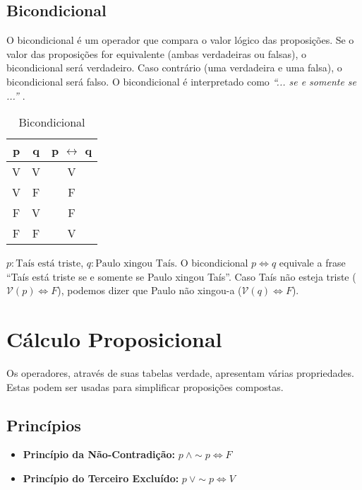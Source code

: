 \subsection*{Bicondicional}
O bicondicional é um operador que compara o valor lógico das proposições. Se o valor das proposições for equivalente (ambas verdadeiras ou falsas), o bicondicional será verdadeiro. Caso contrário (uma verdadeira e uma falsa), o bicondicional será falso. O bicondicional é interpretado como \textit{``... se e somente se ...''} .
\begin{table}[H]
\centering
\caption{Bicondicional}
\label{ifonlyif}
\begin{tabular}{c|c|c}
\textbf{p} & \textbf{q} & \textbf{p $\leftrightarrow$ q} \\ \hline
V          & V          & V             \\
V          & F          & F             \\
F          & V          & F             \\
F          & F          & V            
\end{tabular}
\end{table}
\begin{exemplo}
$p: \text{Taís está triste}$, $q: \text{Paulo xingou Taís}$. O bicondicional $p \Leftrightarrow q$ equivale a frase ``Taís está triste se e somente se Paulo xingou Taís''. Caso Taís não esteja triste ($\mathcal{V}(p) \Leftrightarrow F$), podemos dizer que Paulo não xingou-a ($\mathcal{V}(q) \Leftrightarrow F$).
\end{exemplo}

\section{Cálculo Proposicional}
Os operadores, através de suas tabelas verdade, apresentam várias propriedades. Estas podem ser usadas para simplificar proposições compostas.

\subsection*{Princípios}
\begin{itemize}
	\item \textbf{Princípio da Não-Contradição:} $p \: \wedge \sim p \Leftrightarrow F$
	\item \textbf{Princípio do Terceiro Excluído:} $p \: \vee \sim p \Leftrightarrow V$
\end{itemize}

